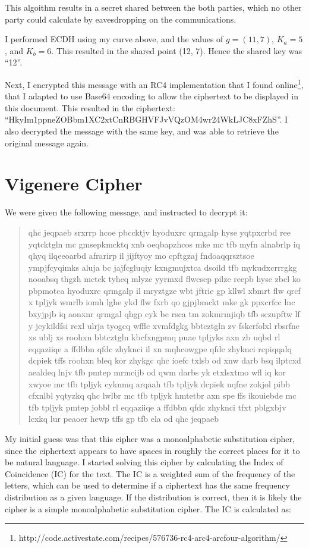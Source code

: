 \documentclass[11pt,a4paper,twoside]{article}
\begin{document}
This algoithm results in a secret shared between the both parties, which no
other party could calculate by eavesdropping on the communications. 

I performed ECDH using my curve above, and the values of $g = (11, 7)$, $K_{a}
= 5$, and  $K_{b} = 6$. This resulted in the shared point (12, 7). Hence the
shared key was ``12''. 

Next, I encrypted this message with an RC4 implementation that I found
online\footnote{http://code.activestate.com/recipes/576736-rc4-arc4-arcfour-algorithm/},
that I adapted to use Base64 encoding to allow the ciphertext to be displayed
in this document. This resulted  in the ciphertext:
``HkyIm1ppneZOBbm1XC2xtCnRBGHVFJvVQzOM4wr24WkLJC8xFZhS''. I also decrypted the
message with the same key, and was able to retrieve the original message again. 

\vfill
\pagebreak
\section{Vigenere Cipher}
We were given the following message, and instructed to decrypt it:

\begin{quote}
\small
\raggedright
qhc jeqpaeb srxrrp hcoe pbccktjv hyoduxrc qrmgalp hyse yqtpxcrbd ree yqtcktgln
mc gmsepkmcktq xnb oeqbapzhcos mke mc tfb myfn alnabrlp iq qhyq ilqeeoarbd
afrarirp il jijftyoy mo cpftgzaj fndoaqqrsztsoe ympjfcyqimks aluja bc
jajfcgluqiy kxngmujxtca dsoild tfb mykudxcrrrgkg nooabsq thgzh mctck tyheq
mlyze yyrmxd flwcsep pilze reepb hyse zbel ko pbpmotca hyoduxrc qrmgalp il
mryztgze wbt jftrie gp kllwl xbmrt flw qrcf x tpljyk wmrlb iomh lghe ykd flw
fxrb qo gjpjbmckt mke gk ppxcrfcc lnc bxyjpjb iq aonxnr qrmgal qhgp cyk bc rsca
tm zokmrmjiqb tfb sczupftw lf y jeykildfsi rcxl ulrja tyogcq wfflc xvmfdgkg
bbtcztgln zv fskcrfolxl rbsrfne xs ublj xs roohxn bbtcztgln kbcfxngpmq puae
tpljyks axn zb uqbd rl eqqaziiqe a ffdbbn qfdc zhyknci il xn mqhcowgpe qfdc
zhyknci rcpiqqalq dcpiek tffs roohxn bleq kor zhykgc qhc ioefc txlsb od xnw
darb bsq ilptcxd aealdeq lnjv tfb pmtep mrmcijb od qwm darbs yk etxlsxtmo wfl
iq kor xwyoe mc tfb tpljyk cyknmq arqaah tfb tpljyk dcpiek uqfne zokjol pibb
cfxnlbl yqtyzkq qhc lwlbr mc tfb tpljyk hmtetbr axn spe ffs ikouiebde mc tfb
tpljyk pmtep jobbl rl eqqaziiqe a ffdbbn qfdc zhyknci tfxt pblgxbjv lcxkq lur
peaoer hewp tffs gp tfb ela od qhc jeqpaeb 
\end{quote}

My initial guess was that this cipher was a monoalphabetic substitution cipher,
since the ciphertext appears to have spaces in roughly the correct places for
it to be natural language. I started solving this cipher by calculating the
Index of Coincidence (IC) for the text. The IC is a weighted sum of the
frequency of the letters, which can be used to determine if a ciphertext has
the same frequency distribution as a given language. If the distribution is
correct, then it is likely the cipher is a simple monoalphabetic substitution
cipher. The IC is calculated as:
\end{document}
